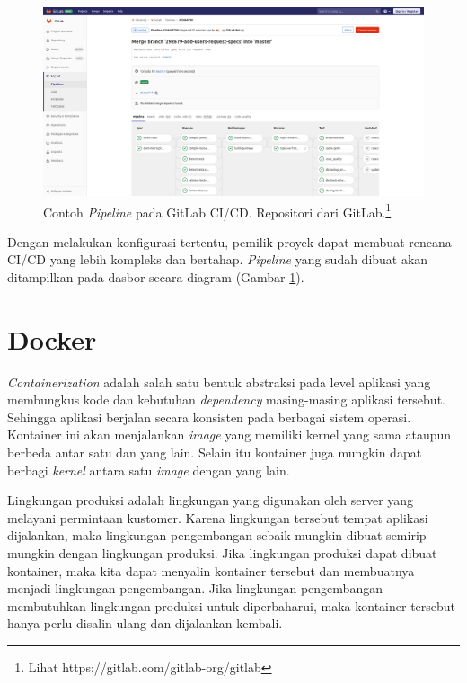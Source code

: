     
    \begin{figure}
        \begin{minipage}{\textwidth}
            \centering
            \includegraphics[width=0.7\paperwidth]{Gambar/gitlab-ci-pipeline.png}
            \caption{Contoh \textit{Pipeline} pada GitLab CI/CD. Repositori dari
            GitLab.\footnote{Lihat https://gitlab.com/gitlab-org/gitlab}}
            \label{fig:gitlab-ci:pipeline}
        \end{minipage}
    \end{figure}
    
    Dengan melakukan konfigurasi tertentu, pemilik proyek dapat membuat rencana
    CI/CD yang lebih kompleks dan bertahap. \textit{Pipeline} yang sudah dibuat
    akan ditampilkan pada dasbor secara diagram (Gambar
    \ref{fig:gitlab-ci:pipeline}).

\section{Docker}
    \textit{Containerization} adalah salah satu bentuk abstraksi pada level
    aplikasi yang membungkus kode dan kebutuhan \textit{dependency} masing-masing aplikasi tersebut.
    Sehingga aplikasi berjalan secara konsisten pada berbagai sistem
    operasi\cite{docker:what-is-container}. Kontainer ini akan menjalankan
    \textit{image} yang memiliki kernel yang sama ataupun berbeda antar satu dan
    yang lain. Selain itu kontainer juga mungkin dapat berbagi \textit{kernel} antara
    satu \textit{image} dengan yang lain.
    
    Lingkungan produksi adalah lingkungan yang digunakan oleh server yang
    melayani permintaan kustomer. Karena lingkungan tersebut tempat aplikasi
    dijalankan, maka lingkungan pengembangan sebaik mungkin dibuat semirip
    mungkin dengan lingkungan produksi. Jika lingkungan produksi dapat
    dibuat kontainer, maka kita dapat menyalin kontainer tersebut dan membuatnya
    menjadi lingkungan pengembangan. Jika lingkungan pengembangan membutuhkan
    lingkungan produksi untuk diperbaharui, maka kontainer tersebut hanya perlu
    disalin ulang dan dijalankan kembali.
    
